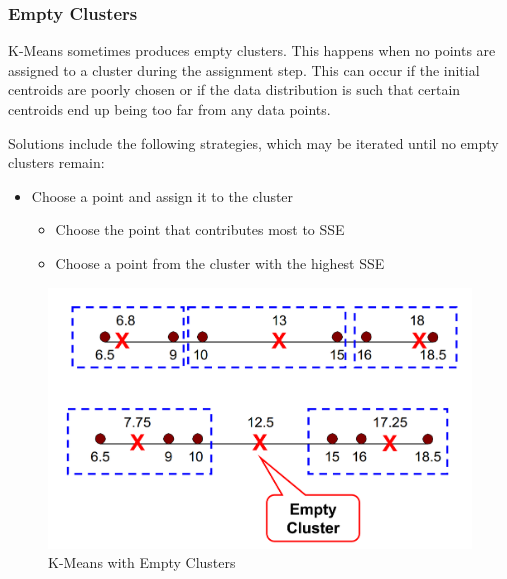 \subsubsection{Empty Clusters}

\begin{paracol}{2}
	
	K-Means sometimes produces empty clusters. This happens when no points are assigned to a cluster during the assignment step. This can occur if the initial centroids are poorly chosen or if the data distribution is such that certain centroids end up being too far from any data points.

	 Solutions include the following strategies, which may be iterated until no empty clusters remain:
	\begin{itemize}
		\item Choose a point and assign it to the cluster
		\begin{itemize}
			\item Choose the point that contributes most to SSE
			\item Choose a point from the cluster with the highest SSE
		\end{itemize}
	\end{itemize}

	\switchcolumn

	\begin{figure}[htbp]
		\centering
		\includegraphics{images/04/kempty.png}
		\caption{K-Means with Empty Clusters}
		\label{fig:04/kempty}
	\end{figure}
\end{paracol}

